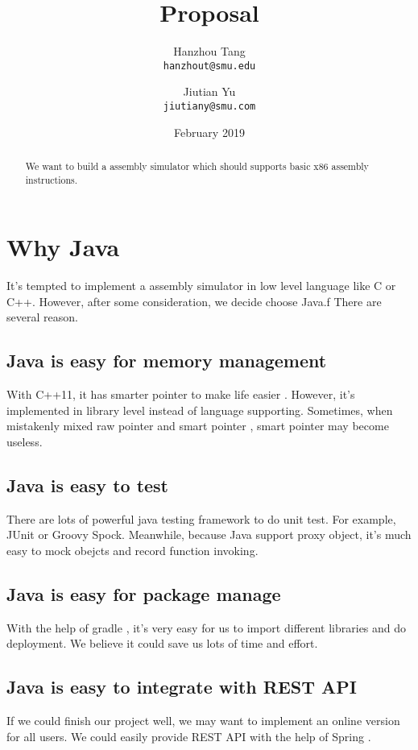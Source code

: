 \documentclass[12pt]{extarticle}
\title{Proposal}
\author{
Hanzhou Tang \\
\texttt{hanzhout@smu.edu}
\and 
Jiutian Yu \\
\texttt{jiutiany@smu.com}
}
\date{February 2019}
\begin{document}
\maketitle
\begin{abstract}
We want to build a assembly simulator which should supports basic x86 assembly instructions.
\end{abstract}
\section{Why Java}
It's tempted to implement a assembly simulator in low level language like C or C++. However, after some consideration, we decide choose Java.f
There are several reason. 
\subsection{Java is easy for memory management}
With C++11, it has smarter pointer  to make life easier \cite{josuttis2012c++}. 
However, it's implemented in library level instead of language supporting.
Sometimes, when mistakenly mixed raw pointer and smart pointer , smart pointer may become useless.
\subsection{Java is easy to test}
There are lots of powerful java testing framework to do unit test. For example, JUnit or Groovy Spock. 
Meanwhile, because Java support proxy object, it's much easy to mock obejcts and record function invoking.
\subsection{Java is easy for package manage}
With the help of gradle \cite{muschko2014gradle}, it's very easy for us to import different libraries and do deployment. We believe it could save us lots of time and effort.
\subsection{Java is easy to integrate with REST API}
If we could finish our project well, we may want to implement an online version for all users. We could easily provide REST API with the help of Spring \cite{walls2005spring}.
\end{document}
